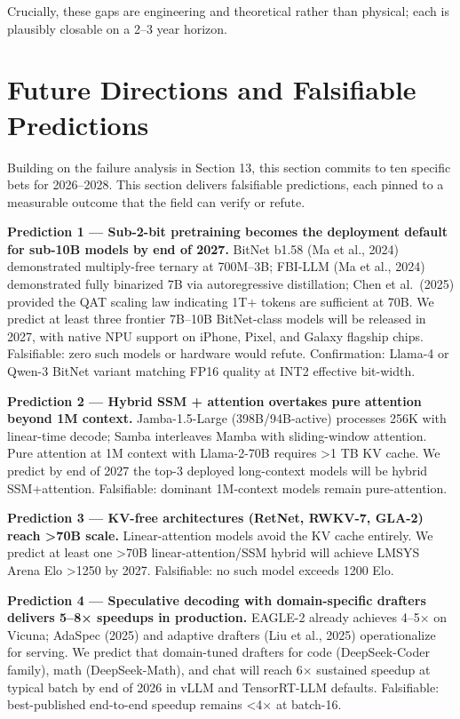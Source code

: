 Crucially, these gaps are engineering and theoretical rather than physical; each is plausibly closable on a 2--3 year horizon.

\section{Future Directions and Falsifiable Predictions}\label{future-directions-and-falsifiable-predictions}

Building on the failure analysis in Section 13, this section commits to ten specific bets for 2026--2028. This section delivers falsifiable predictions, each pinned to a measurable outcome that the field can verify or refute.

\textbf{Prediction 1 --- Sub-2-bit pretraining becomes the deployment default for sub-10B models by end of 2027.} BitNet b1.58 (Ma et al., 2024) demonstrated multiply-free ternary at 700M--3B; FBI-LLM (Ma et al., 2024) demonstrated fully binarized 7B via autoregressive distillation; Chen et al.~(2025) provided the QAT scaling law indicating 1T+ tokens are sufficient at 70B. We predict at least three frontier 7B--10B BitNet-class models will be released in 2027, with native NPU support on iPhone, Pixel, and Galaxy flagship chips. Falsifiable: zero such models or hardware would refute. Confirmation: Llama-4 or Qwen-3 BitNet variant matching FP16 quality at INT2 effective bit-width.

\textbf{Prediction 2 --- Hybrid SSM + attention overtakes pure attention beyond 1M context.} Jamba-1.5-Large (398B/94B-active) processes 256K with linear-time decode; Samba interleaves Mamba with sliding-window attention. Pure attention at 1M context with Llama-2-70B requires \textgreater1 TB KV cache. We predict by end of 2027 the top-3 deployed long-context models will be hybrid SSM+attention. Falsifiable: dominant 1M-context models remain pure-attention.

\textbf{Prediction 3 --- KV-free architectures (RetNet, RWKV-7, GLA-2) reach \textgreater70B scale.} Linear-attention models avoid the KV cache entirely. We predict at least one \textgreater70B linear-attention/SSM hybrid will achieve LMSYS Arena Elo \textgreater1250 by 2027. Falsifiable: no such model exceeds 1200 Elo.

\textbf{Prediction 4 --- Speculative decoding with domain-specific drafters delivers 5--8× speedups in production.} EAGLE-2 already achieves 4--5× on Vicuna; AdaSpec (2025) and adaptive drafters (Liu et al., 2025) operationalize for serving. We predict that domain-tuned drafters for code (DeepSeek-Coder family), math (DeepSeek-Math), and chat will reach 6× sustained speedup at typical batch by end of 2026 in vLLM and TensorRT-LLM defaults. Falsifiable: best-published end-to-end speedup remains \textless4× at batch-16.

